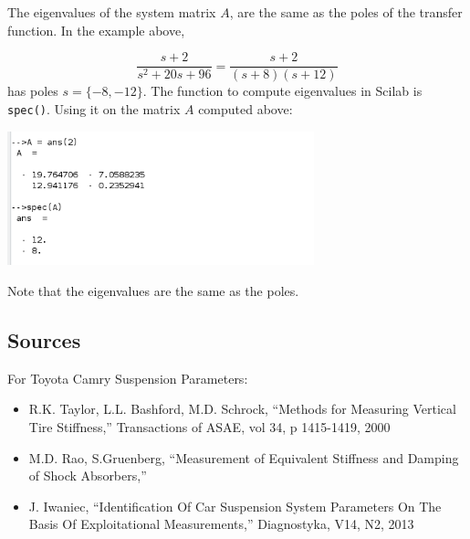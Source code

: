 The eigenvalues of the system matrix $A$, are the same as the poles of the transfer function. 
 In the example above, 
 
\[
\frac{s+2}{s^2+20s+96} = \frac{s+2}{(s+8)(s+12)}
\]
has poles $s=\{-8,-12\}$.    The function to compute eigenvalues in Scilab is {\tt spec()}.  Using
it on the matrix $A$ computed above:

\begin{center}
\includegraphics[width=3.5in]{figs04/ss_eigenvals.png}
\end{center}

Note that the eigenvalues are the same as the poles.  
% 
% 


\subsection{Sources}
For Toyota Camry Suspension Parameters:
\begin{itemize}
    \item R.K. Taylor, L.L. Bashford, M.D. Schrock, ``Methods for Measuring Vertical Tire Stiffness,''
    Transactions of ASAE, vol 34, p 1415-1419, 2000
    \item M.D. Rao, S.Gruenberg, ``Measurement of Equivalent Stiffness and Damping of Shock Absorbers,''
    \item J. Iwaniec, ``Identification Of Car Suspension System Parameters On The Basis Of Exploitational Measurements,'' Diagnostyka, V14, N2, 2013
\end{itemize}

